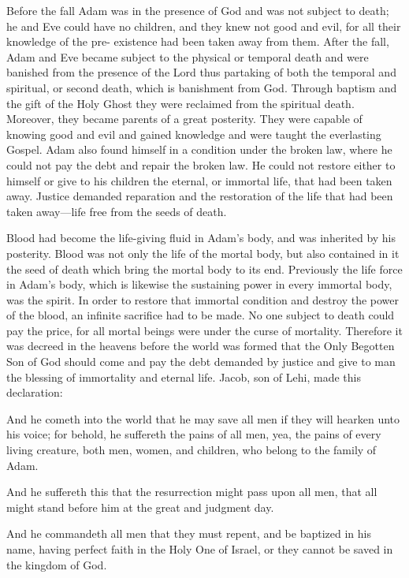Before the fall Adam was in the presence of God and was not subject to death; he and Eve
could have no children, and they knew not good and evil, for all their knowledge of the pre-
existence had been taken away from them. After the fall, Adam and Eve became subject to
the physical or temporal death and were banished from the presence of the Lord thus
partaking of both the temporal and spiritual, or second death, which is banishment from God.
Through baptism and the gift of the Holy Ghost they were reclaimed from the spiritual death.
Moreover, they became parents of a great posterity. They were capable of knowing good and
evil and gained knowledge and were taught the everlasting Gospel. Adam also found himself
in a condition under the broken law, where he could not pay the debt and repair the broken
law. He could not restore either to himself or give to his children the eternal, or immortal life,
that had been taken away. Justice demanded reparation and the restoration of the life that had
been taken away—life free from the seeds of death.

Blood had become the life-giving fluid in Adam's body, and was inherited by his posterity.
Blood was not only the life of the mortal body, but also contained in it the seed of death
which bring the mortal body to its end. Previously the life force in Adam's body, which is
likewise the sustaining power in every immortal body, was the spirit. In order to restore that
immortal condition and destroy the power of the blood, an infinite sacrifice had to be made.
No one subject to death could pay the price, for all mortal beings were under the curse of
mortality. Therefore it was decreed in the heavens before the world was formed that the Only
Begotten Son of God should come and pay the debt demanded by justice and give to man the
blessing of immortality and eternal life. Jacob, son of Lehi, made this declaration:

And he cometh into the world that he may save all men if they will hearken unto his voice;
for behold, he suffereth the pains of all men, yea, the pains of every living creature, both
men, women, and children, who belong to the family of Adam.

And he suffereth this that the resurrection might pass upon all men, that all might stand
before him at the great and judgment day.

And he commandeth all men that they must repent, and be baptized in his name, having
perfect faith in the Holy One of Israel, or they cannot be saved in the kingdom of God.

